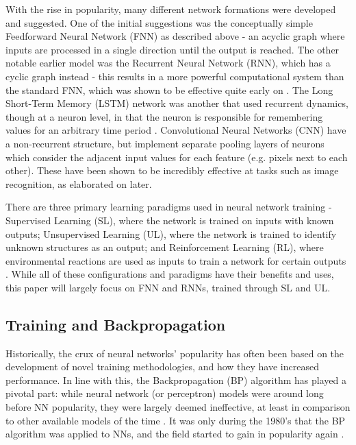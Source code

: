 \documentclass[a4paper,latin]{paper}
\begin{document}
With the rise in popularity, many different network formations were developed and suggested. One of the initial 
suggestions was the conceptually simple Feedforward Neural Network (FNN) as described above - an acyclic
 graph where inputs are processed in a single direction until the output is reached. The other notable earlier model 
 was the Recurrent Neural Network (RNN), which has a cyclic graph instead - this results in a more powerful 
 computational system than the standard FNN, which was shown to be effective quite early on 
\cite{Siegelmann}. The Long Short-Term Memory (LSTM) network was 
 another that used recurrent dynamics, though at a neuron level, in that the neuron is responsible for remembering 
 values for an arbitrary time period \cite{Hochreiter}. Convolutional Neural Networks (CNN) have a non-recurrent structure, 
 but implement separate pooling layers of neurons which consider the adjacent input values for each feature 
 (e.g. pixels next to each other). These have been shown to be incredibly effective at tasks such as image 
 recognition, as elaborated on later.
\hfill \break 

There are three primary learning paradigms used in neural network training - Supervised Learning (SL), 
where the network is trained on inputs with known outputs; Unsupervised Learning (UL), where the network is 
trained to identify unknown structures as an output; and Reinforcement Learning (RL), where environmental
reactions are used as inputs to train a network for certain outputs \cite{Schmidhuber}. While all of these configurations and paradigms 
have their benefits and uses, this paper will largely focus on FNN and RNNs, trained through SL and UL.
\hfill \break 

\subsection{Training and Backpropagation}

Historically, the crux of neural networks’ popularity has often been based on the development of novel training 
methodologies, and how they have increased performance. In line with this, the Backpropagation (BP) algorithm 
has played a pivotal part: while neural network (or perceptron) models were around long before NN popularity, 
they were largely deemed ineffective, at least in comparison to other available models of the time 
\cite{Minksy}. It was only during the 1980’s that the BP algorithm was applied to NNs, and 
the field started to gain in popularity again \cite{LeCun2, Werbos2}.
\hfill \break 
\end{document}
